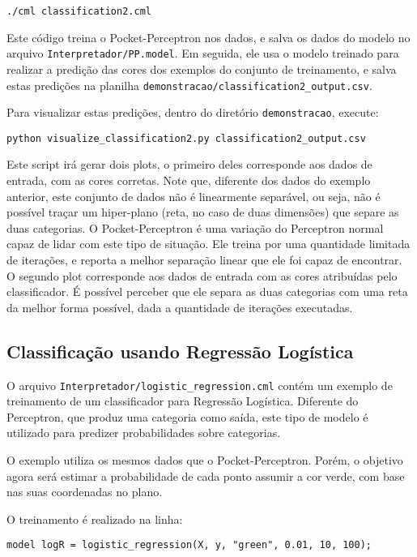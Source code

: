 \documentclass[12pt]{article}
\begin{document}
\begin{verbatim}
./cml classification2.cml
\end{verbatim}

Este código treina o Pocket-Perceptron nos dados, e salva os dados do modelo no arquivo \texttt{Interpretador/PP.model}. Em seguida, ele usa o modelo treinado para realizar a predição das cores dos exemplos do conjunto de treinamento, e salva estas predições na planilha \texttt{demonstracao/classification2\_output.csv}.

Para visualizar estas predições, dentro do diretório \texttt{demonstracao}, execute:

\begin{verbatim}
python visualize_classification2.py classification2_output.csv
\end{verbatim}

Este script irá gerar dois plots, o primeiro deles corresponde aos dados de entrada, com as cores corretas. Note que, diferente dos dados do exemplo anterior, este conjunto de dados não é linearmente separável, ou seja, não é possível traçar um hiper-plano (reta, no caso de duas dimensões) que separe as duas categorias. O Pocket-Perceptron é uma variação do Perceptron normal capaz de lidar com este tipo de situação. Ele treina por uma quantidade limitada de iterações, e reporta a melhor separação linear que ele foi capaz de encontrar. O segundo plot corresponde aos dados de entrada com as cores atribuídas pelo classificador. É possível perceber que ele separa as duas categorias com uma reta da melhor forma possível, dada a quantidade de iterações executadas.

\subsection{Classificação usando Regressão Logística}

O arquivo \texttt{Interpretador/logistic\_regression.cml} contém um exemplo de treinamento de um classificador para Regressão Logística. Diferente do Perceptron, que produz uma categoria como saída, este tipo de modelo é utilizado para predizer probabilidades sobre categorias.

O exemplo utiliza os mesmos dados que o Pocket-Perceptron. Porém, o objetivo agora será estimar a probabilidade de cada ponto assumir a cor verde, com base nas suas coordenadas no plano.

O treinamento é realizado na linha:

\begin{verbatim}
model logR = logistic_regression(X, y, "green", 0.01, 10, 100);
\end{verbatim}
\end{document}
